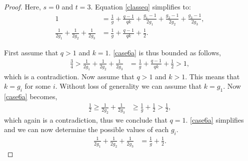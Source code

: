 \begin{proof} Here, $s = 0$ and $t = 3$. Equation \eqref{classeq} simplifies to:
\begin{align} \label{case6a} 1 &= \frac{1}{g} + \frac{q-1}{qk} + \frac{g_1 -1}{2g_1} + \frac{g_2 -1}{2g_2} + \frac{g_3 -1}{2g_3}, \nonumber
\\[1ex] \frac{1}{2g_1} + \frac{1}{2g_2} + \frac{1}{2g_3} &= \frac{1}{g} + \frac{q-1}{qk} + \frac{1}{2}.
\end{align}

First assume that $q > 1$ and $k=1$. \eqref{case6a} is thus bounded as follows,
\begin{align*} \frac{3}{4} > \frac{1}{2g_1} + \frac{1}{2g_2} + \frac{1}{2g_3} &= \frac{1}{g} + \frac{q-1}{qk} + \frac{1}{2} > 1,
\end{align*}
which is a contradiction. Now assume that $q > 1$ and $k > 1$. This means that $k=g_i$ for some $i$. Without loss of generality we can assume that $k=g_1$. Now \eqref{case6a} becomes,
\begin{align*} \frac{1}{2} \geq \frac{1}{2g_2} + \frac{1}{2g_3} &\geq \frac{1}{g} + \frac{1}{2} > \frac{1}{2},
\end{align*}
which again is a contradiction, thus we conclude that $q=1$. \eqref{case6a} simplifies and we can now determine the possible values of each $g_i$.
 \begin{align} \label{case6b} \frac{1}{2g_1} + \frac{1}{2g_2} + \frac{1}{2g_3} &= \frac{1}{g} + \frac{1}{2}.
\end{align}


\end{proof}
